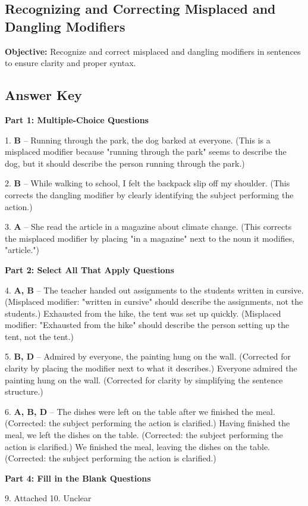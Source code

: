\documentclass[12pt]{article}
\begin{document}
\subsection*{Recognizing and Correcting Misplaced and Dangling Modifiers}
\onehalfspacing

\begin{tcolorbox}[colframe=black!40, colback=gray!0, title=Learning Objective]
\textbf{Objective:} Recognize and correct misplaced and dangling modifiers in sentences to ensure clarity and proper syntax.
\end{tcolorbox}


\subsection*{Answer Key}

\textbf{Part 1: Multiple-Choice Questions}

1. \textbf{B} – Running through the park, the dog barked at everyone. (This is a misplaced modifier because "running through the park" seems to describe the dog, but it should describe the person running through the park.)

2. \textbf{B} – While walking to school, I felt the backpack slip off my shoulder. (This corrects the dangling modifier by clearly identifying the subject performing the action.)

3. \textbf{A} – She read the article in a magazine about climate change. (This corrects the misplaced modifier by placing "in a magazine" next to the noun it modifies, "article.")

\textbf{Part 2: Select All That Apply Questions}

4. \textbf{A, B} – The teacher handed out assignments to the students written in cursive. (Misplaced modifier: "written in cursive" should describe the assignments, not the students.)  
Exhausted from the hike, the tent was set up quickly. (Misplaced modifier: "Exhausted from the hike" should describe the person setting up the tent, not the tent.)

5. \textbf{B, D} – Admired by everyone, the painting hung on the wall. (Corrected for clarity by placing the modifier next to what it describes.)  
Everyone admired the painting hung on the wall. (Corrected for clarity by simplifying the sentence structure.)

6. \textbf{A, B, D} – The dishes were left on the table after we finished the meal. (Corrected: the subject performing the action is clarified.)  
Having finished the meal, we left the dishes on the table. (Corrected: the subject performing the action is clarified.)  
We finished the meal, leaving the dishes on the table. (Corrected: the subject performing the action is clarified.)

\textbf{Part 4: Fill in the Blank Questions}

9. Attached  
10. Unclear  
\end{document}
